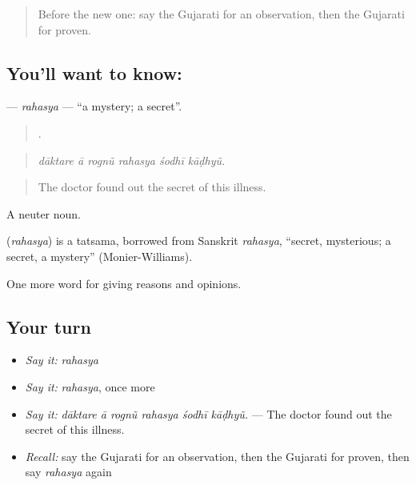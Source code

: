 \begin{quote}
Before the new one: say the Gujarati for an observation, then the Gujarati for proven.
\end{quote}

\subsection*{You'll want to know: }
\textbf{} — \emph{rahasya} — \textquotedblleft{}a mystery; a secret\textquotedblright{}.

\begin{quote}
     .
\end{quote}

\begin{quote}
\emph{dāktare ā rognũ rahasya śodhī kāḍhyũ.}
\end{quote}

\begin{quote}
The doctor found out the secret of this illness.
\end{quote}

A neuter noun.

\begin{cousinweb}
\textbf{} (\emph{rahasya}) is a tatsama, borrowed from Sanskrit \emph{rahasya}, \textquotedblleft{}secret, mysterious; a secret, a mystery\textquotedblright{} (Monier-Williams).
\end{cousinweb}

\begin{grammarlens}[title={What you've built}]
One more word for giving reasons and opinions.
\end{grammarlens}

\subsection*{Your turn}
\begin{itemize}
\raggedright
  \item \emph{Say it:} \emph{rahasya}
  \item \emph{Say it:} \emph{rahasya}, once more
  \item \emph{Say it:} \emph{dāktare ā rognũ rahasya śodhī kāḍhyũ.} — The doctor found out the secret of this illness.
  \item \emph{Recall:} say the Gujarati for an observation, then the Gujarati for proven, then say \emph{rahasya} again
\end{itemize}

